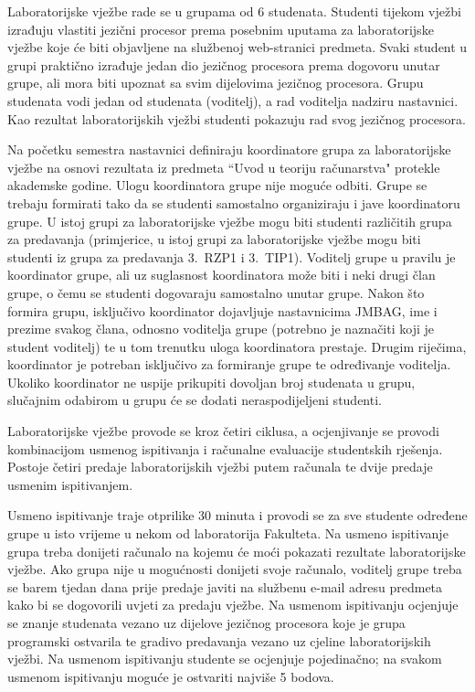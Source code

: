 \documentclass[times, 12pt, utf8]{book}
\begin{document}
Laboratorijske vježbe rade se u grupama od 6 studenata.
Studenti tijekom vježbi izrađuju vlastiti jezični procesor prema posebnim uputama za laboratorijske vježbe koje će biti objavljene na službenoj web-stranici predmeta.
Svaki student u grupi praktično izrađuje jedan dio jezičnog procesora prema dogovoru unutar grupe, ali mora biti upoznat sa svim dijelovima jezičnog procesora.
Grupu studenata vodi jedan od studenata (voditelj), a rad voditelja nadziru nastavnici.
Kao rezultat laboratorijskih vježbi studenti pokazuju rad svog jezičnog procesora.

Na početku semestra nastavnici definiraju koordinatore grupa za laboratorijske vježbe na osnovi rezultata iz predmeta ``Uvod u teoriju računarstva" protekle akademske godine.
Ulogu koordinatora grupe nije moguće odbiti.
Grupe se trebaju formirati tako da se studenti samostalno organiziraju i jave koordinatoru grupe.
U istoj grupi za laboratorijske vježbe mogu biti studenti različitih grupa za predavanja (primjerice, u istoj grupi za laboratorijske vježbe mogu biti studenti iz grupa za predavanja 3.~RZP1 i 3.~TIP1).
Voditelj grupe u pravilu je koordinator grupe, ali uz suglasnost koordinatora može biti i neki drugi član grupe, o čemu se studenti dogovaraju samostalno unutar grupe.
Nakon što formira grupu, isključivo koordinator dojavljuje nastavnicima JMBAG, ime i prezime svakog člana, odnosno voditelja grupe (potrebno je naznačiti koji je student voditelj) te u tom trenutku uloga koordinatora prestaje.
Drugim riječima, koordinator je potreban isključivo za formiranje grupe te određivanje voditelja.
Ukoliko koordinator ne uspije prikupiti dovoljan broj studenata u grupu, slučajnim odabirom u grupu će se dodati neraspodijeljeni studenti. 

Laboratorijske vježbe provode se kroz četiri ciklusa, a ocjenjivanje se provodi kombinacijom usmenog ispitivanja i računalne evaluacije studentskih rješenja.
Postoje četiri predaje laboratorijskih vježbi putem računala te dvije predaje usmenim ispitivanjem.

Usmeno ispitivanje traje otprilike 30 minuta i provodi se za sve studente određene grupe u isto vrijeme u nekom od laboratorija Fakulteta.
Na usmeno ispitivanje grupa treba donijeti računalo na kojemu će moći pokazati rezultate laboratorijske vježbe.
Ako grupa nije u mogućnosti donijeti svoje računalo, voditelj grupe treba se barem tjedan dana prije predaje javiti na službenu e-mail adresu predmeta kako bi se dogovorili uvjeti za predaju vježbe.
Na usmenom ispitivanju ocjenjuje se znanje studenata vezano uz dijelove jezičnog procesora koje je grupa programski ostvarila te gradivo predavanja vezano uz cjeline laboratorijskih vježbi.
Na usmenom ispitivanju studente se ocjenjuje pojedinačno; na svakom usmenom ispitivanju moguće je ostvariti najviše 5 bodova.
\end{document}
